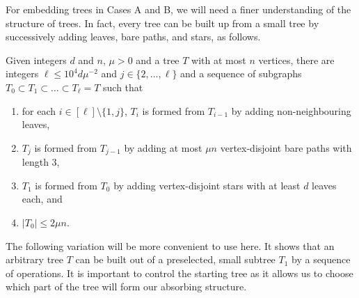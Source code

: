 For embedding trees in Cases A and B, we will need a finer understanding of the structure of trees. In fact, every tree can be built up from a small tree by successively adding leaves, bare paths, and stars, as follows.
 \begin{lemma}\label{Lemma_decomp} Given integers $d$ and $n$, $\mu>0$ and a tree $T$ with at most $n$ vertices, there are integers $\ell\leq 10^4 d\mu^{-2}$ and $j\in\{2,\ldots,\ell\}$ and a sequence of subgraphs $T_0\subset T_1\subset \ldots \subset T_\ell=T$ such that
\begin{enumerate}[label = {\bfseries \Alph{propcounter}\arabic{enumi}}]
\item for each $i\in [\ell]\setminus \{1,j\}$, $T_{i}$ is formed from $T_{i-1}$ by adding non-neighbouring leaves,\label{cond1}
\item $T_j$ is formed from $T_{j-1}$ by adding at most $\mu n$ vertex-disjoint bare paths with length $3$,\label{cond2}
\item $T_1$ is formed from $T_0$ by adding vertex-disjoint stars with at least $d$ leaves each, and\label{cond3}
\item $|T_0|\leq 2\mu n$.\label{cond4}
\end{enumerate}
\end{lemma}

The following variation will be more convenient to use here. It shows that an arbitrary tree $T$ can be built out of a preselected, small subtree $T_1$ by a sequence of operations. It is important to control the starting tree as it allows us to choose which part of the tree will form our absorbing structure.

